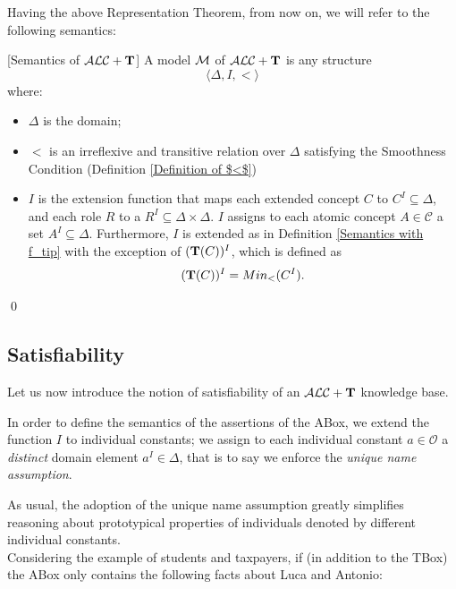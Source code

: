 \documentclass[a4paper, 11pt, oneside]{duthesis}
\newcommand{\tip}{{\bf T}}
\newcommand{\alct}{\mathcal{ALC}+\tip}
\newcommand{\emme} {\begin{mathcal}M\end{mathcal}}
\newenvironment{definition}
{\begin{defi} \rm}{\qed \end{defi}}
\newenvironment{definition}
{\begin{defi} \rm}{\qed \end{defi}}
\newtheorem{definition}{Definition}
\newcounter{posu}
\newtheorem{definition}[posu]{Definition}
\begin{document}
\newpage

\noindent Having the above Representation Theorem, from now on, we will refer to the following semantics:

\begin{definition}[Semantics of $\alct$]\label{Semantics of T} A model $\emme$ of $\alct$ is any structure $$\langle \Delta, I, < \rangle$$ where:

\begin{itemize}

\item $\Delta$ is the domain;

\item $<$ is an irreflexive and transitive relation over $\Delta$ satisfying the Smoothness Condition (Definition \ref{Definition of $<$})

\item $I$ is the extension function that maps each  extended concept $C$ to $C^I \subseteq \Delta$, and each role $R$ to a $R^I \subseteq \Delta \times \Delta$.
$I$ assigns to each atomic concept $A \in \mathcal{C}$ a set $A^I \subseteq \Delta$.
Furthermore, $I$ is extended as in Definition \ref{Semantics with f_tip} with the exception of $(\tip(C))^I$, which is defined as $$(\tip(C))^I = Min_<(C^I).$$
\end{itemize}

\end{definition}

\subsection{Satisfiability}

\noindent Let us now introduce the notion of satisfiability of an $\alct$ knowledge base.

In order to define the semantics of the assertions of the ABox, we  extend the function $I$ to individual constants;  we assign to each individual constant $a \in \mathcal{O}$ a \emph{distinct} domain element $a^I \in \Delta$, that is to say we enforce the \emph{unique name assumption}.

As usual, the adoption of the  unique name assumption greatly simplifies reasoning about prototypical properties of individuals denoted by different individual constants.\\


Considering the example of students and taxpayers, if (in addition to the TBox) the ABox only contains the following facts about Luca and Antonio:
\end{document}
